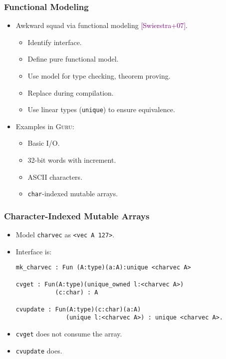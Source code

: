 \documentclass[11pt]{beamer}
\begin{document}
\begin{frame}
\frametitle{Functional Modeling}

\begin{itemize}
\item Awkward squad via functional modeling \textcolor{purple}{[Swierstra+07]}.
\begin{itemize}
\item Identify interface.
\item Define pure functional model.
\item Use model for type checking, theorem proving.
\item Replace during compilation.
\item Use linear types (\texttt{unique}) to ensure equivalence.
\end{itemize}
\item Examples in \textsc{Guru}:
\begin{itemize}
\item Basic I/O.
\item 32-bit words with increment.
\item ASCII characters.
\item \texttt{char}-indexed mutable arrays.
\end{itemize}
\end{itemize}

\end{frame}

\begin{frame}[containsverbatim]
\frametitle{Character-Indexed Mutable Arrays}

\begin{itemize}
\item Model \texttt{charvec} as \texttt{<vec A 127>}.
\item Interface is: 


{\footnotesize
\begin{verbatim}
mk_charvec : Fun (A:type)(a:A):unique <charvec A>

cvget : Fun(A:type)(unique_owned l:<charvec A>)
           (c:char) : A

cvupdate : Fun(A:type)(c:char)(a:A)
              (unique l:<charvec A>) : unique <charvec A>.
\end{verbatim}
}

\item \texttt{cvget} does not consume the array.

\item \texttt{cvupdate} does.

\end{itemize}


\end{frame}
\end{document}
